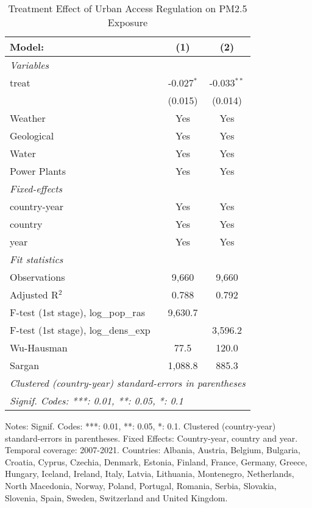 
\begin{table}[htbp]
   \caption{\label{tab:did_all} Treatment Effect of Urban Access Regulation on PM2.5 Exposure}
   \centering
   \small
   \begin{tabular}{lcc}
      \tabularnewline \midrule \midrule
      Model:                           & (1)          & (2)\\  
      \midrule
      \emph{Variables}\\
      treat                            & -0.027$^{*}$ & -0.033$^{**}$\\   
                                       & (0.015)      & (0.014)\\   
      Weather                          & Yes          & Yes\\  
      Geological                       & Yes          & Yes\\  
      Water                            & Yes          & Yes\\  
      Power Plants                     & Yes          & Yes\\  
      \midrule
      \emph{Fixed-effects}\\
      country-year                     & Yes          & Yes\\  
      country                          & Yes          & Yes\\  
      year                             & Yes          & Yes\\  
      \midrule
      \emph{Fit statistics}\\
      Observations                     & 9,660        & 9,660\\  
      Adjusted R$^2$                   & 0.788        & 0.792\\  
      F-test (1st stage), log_pop_ras  & 9,630.7      & \\  
      F-test (1st stage), log_dens_exp &              & 3,596.2\\  
      Wu-Hausman                       & 77.5         & 120.0\\  
      Sargan                           & 1,088.8      & 885.3\\  
      \midrule \midrule
      \multicolumn{3}{l}{\emph{Clustered (country-year) standard-errors in parentheses}}\\
      \multicolumn{3}{l}{\emph{Signif. Codes: ***: 0.01, **: 0.05, *: 0.1}}\\
   \end{tabular}
   
   \par \raggedright 
   Notes: Signif. Codes: ***: 0.01, **: 0.05, *: 0.1. Clustered (country-year) standard-errors in parentheses. Fixed Effects: Country-year, country and year. Temporal coverage: 2007-2021. Countries: Albania, Austria, Belgium, Bulgaria, Croatia, Cyprus, Czechia, Denmark, Estonia, Finland, France, Germany, Greece, Hungary, Iceland, Ireland, Italy, Latvia, Lithuania, Montenegro, Netherlands, North Macedonia, Norway, Poland, Portugal, Romania, Serbia, Slovakia, Slovenia, Spain, Sweden, Switzerland and United Kingdom.
\end{table}


